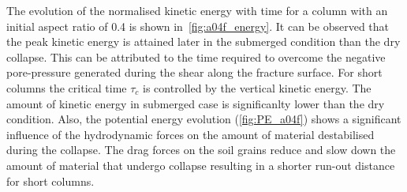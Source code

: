 The evolution of the normalised kinetic energy with time for a column with an 
initial aspect ratio of 0.4 is shown in~\cref{fig:a04f_energy}. It can be 
observed that the peak kinetic energy is attained later in the submerged 
condition than the dry collapse. This can be attributed to the time required to 
overcome the negative pore-pressure generated during the shear along the 
fracture surface. For short columns the critical time $\tau_c$ is controlled by 
the vertical kinetic energy. The amount of kinetic energy in submerged case is 
significanlty lower than the dry condition. Also, the potential energy 
evolution (\cref{fig:PE_a04f}) shows a significant influence of the 
hydrodynamic forces on the amount of material destabilised during the collapse. 
The drag forces on the soil grains reduce and slow down the amount of material 
that undergo collapse resulting in a shorter run-out distance for short 
columns. 
